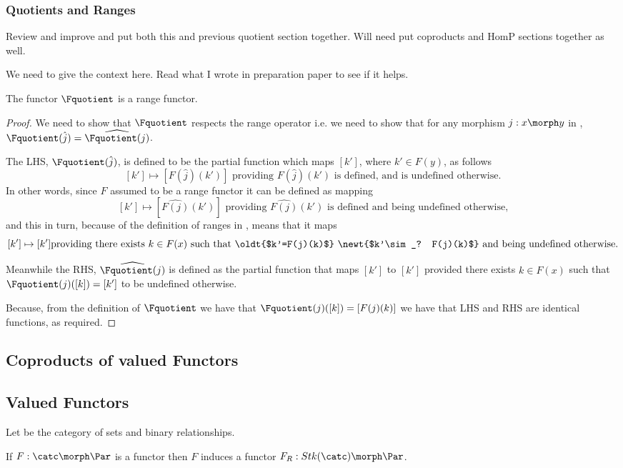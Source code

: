 \subsubsection{Quotients and Ranges }
\begin{worktt}
Review and improve and put both this and previous quotient
section together. Will need put coproducts and HomP sections
together as well.
\end{worktt}
\begin{lemma}
\label{rangefunctorquotient}
\begin{worktt}
We need to give the context here. Read what I wrote in preparation paper to see if it helps.
\end{worktt}
The functor $\Fquotient$ is a range functor.
\end{lemma}
\begin{proof} 
We need to show that  $\Fquotient$ respects the range operator
i.e. we need to show that for any morphism $j:x \morph y$ in \catcw, 
 $\Fquotient(\hat{j})= \widehat{\Fquotient(j)}$.

The LHS, $\Fquotient(\hat{j})$, is defined to  be 
the partial function which maps $[k']$, where $k' \in F(y)$, as follows
$$ [k'] \mapsto [F(\hat{j})(k')] \mbox{ providing $F(\hat{j})(k')$ is defined, and is undefined otherwise.}$$
In other words, since  $F$ assumed to be a range functor it can be defined as mapping
$$ [k'] \mapsto [\widehat{F(j)}(k')] \mbox{ providing $\widehat{F(j)}(k')$ is defined and being undefined otherwise,}$$
and this in turn, because of the definition of ranges in \Par, means that it maps
$$ [k'] \mapsto [k'] \mbox{providing there exists $k \in F(x)$ such that 
\oldt{$k'=F(j)(k)$}
\newt{$k'\sim_? F(j)(k)$} and being undefined otherwise.}$$

Meanwhile the RHS, $\widehat{\Fquotient(j)}$  is defined as the partial function that 
maps $[k']$  to $[k']$  provided  there exists $k \in F(x)$ such that
$\Fquotient(j)([k])=[k']$ to be undefined otherwise.

Because,
from the definition of $\Fquotient$ we have that $\Fquotient(j)([k])= [F(j)(k)]$   
we have  that LHS and RHS are identical functions, as required.
\end{proof}

\subsection{Coproducts of \Par valued  Functors}
\tbd 

\subsection{\Rel Valued Functors}
Let \Rel be the category of sets and binary relationships.

If $F: \catc \morph \Par$ is a functor then $F$ induces 
a functor $F_R : Stk(\catc) \morph \Par$.